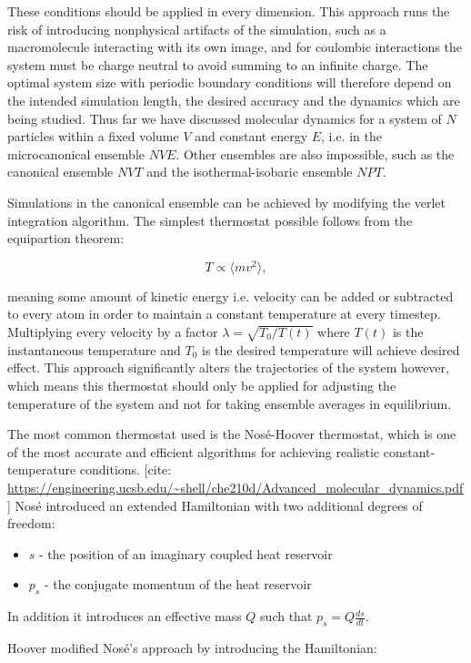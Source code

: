 These conditions should be applied in every dimension.
This approach runs the risk of introducing nonphysical artifacts
of the simulation, such as a macromolecule interacting with its own image,
and for coulombic interactions the system must be charge neutral to avoid
summing to an infinite charge.
The optimal system size with periodic boundary conditions
will therefore depend on the intended simulation length, the desired accuracy
and the dynamics which are being studied.
\newline
\newline
Thus far we have discussed molecular dynamics for a system of $N$ particles
within a fixed volume $V$ and constant energy $E$, i.e. in the
microcanonical ensemble $NVE$. Other ensembles are also impossible,
such as the canonical ensemble $NVT$ and the isothermal-isobaric ensemble
$NPT$.
\par
Simulations in the canonical ensemble can be achieved by modifying the verlet
integration algorithm. The simplest thermostat possible
follows from the equipartion theorem:

$$ T \propto \langle mv^2 \rangle , $$

meaning some amount of kinetic energy i.e. velocity
can be added or subtracted to every atom in order to maintain
a constant temperature at every timestep.
Multiplying every velocity by a factor $\lambda = \sqrt{T_0 / T(t)}$
where $T(t)$ is the instantaneous temperature and $T_0$
is the desired temperature will achieve desired effect.
This approach significantly alters the trajectories of the system however,
which means this thermostat should only be applied for adjusting
the temperature of the system and not for taking ensemble averages
in equilibrium.
\par
The most common thermostat used is the Nosé-Hoover thermostat,
which is one of the most accurate and efficient algorithms
for achieving realistic constant-temperature conditions.
[cite: \url{https://engineering.ucsb.edu/~shell/che210d/Advanced_molecular_dynamics.pdf}]
Nosé introduced an extended Hamiltonian with two additional degrees of freedom:

\begin{itemize}
    \item $s$ - the position of an imaginary coupled heat reservoir
    \item $p_s$ - the conjugate momentum of the heat reservoir
\end{itemize}

In addition it introduces an effective mass $Q$ such that $p_s = Q\frac{ds}{dt}$.
\par
Hoover modified Nosé's approach by introducing the Hamiltonian:

